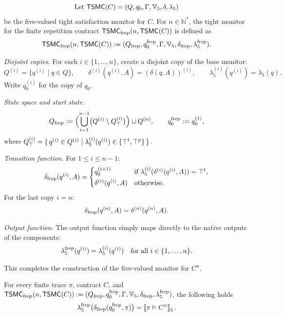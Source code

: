 \begin{definition}
\label{def:moore-repeat-finite}
\[\text{Let } \mathsf{TSMC}(C)=(Q,q_0,\Gamma,\mathbb{V}_5 ,\delta,\lambda_5)\]
be the five-valued tight satisfaction monitor for $C$.  
For $n\in\mathbb{N}^*$, the tight monitor for the finite repetition contract
$\mathsf{TSMC}_{\text{frep}}(n,\mathsf{TSMC}(C))$ is defined as
\[
\mathsf{TSMC}_{\text{frep}}(n,\mathsf{TSMC}(C))
  := (Q_{\text{frep}},q_0^{\text{frep}},\Gamma,\mathbb{V}_5 ,\delta_{\text{frep}},\lambda_5^{\text{frep}}).
\]

\medskip
\noindent\emph{Disjoint copies.}
For each $i\in\{1,\dots,n\}$, create a disjoint copy of the base monitor:
\[
Q^{(i)}=\{q^{(i)}\mid q\in Q\},\qquad
\delta^{(i)}(q^{(i)},A)=(\delta(q,A))^{(i)},\qquad
\lambda_5^{(i)}(q^{(i)})=\lambda_5(q).
\]
Write $q_0^{(i)}$ for the copy of $q_0$.

\medskip
\noindent\emph{State space and start state.}
\[
Q_{\text{frep}}
  := \Bigl(\bigcup_{i=1}^{n-1} \bigl(Q^{(i)} \setminus Q^{(i)}_{\top}\bigr)\Bigr) \cup Q^{(n)},
\qquad
q_0^{\text{frep}} := q_0^{(1)},
\]
where $Q^{(i)}_{\top} = \{\, q^{(i)} \in Q^{(i)} \mid \lambda_5^{(i)}(q^{(i)}) \in \{\top^t,\top^p\}\,\}$.

\medskip
\noindent\emph{Transition function.}  
For $1\le i\le n-1$:
\[
\delta_{\text{frep}}(q^{(i)},A)=
\begin{cases}
q_0^{(i+1)}
   & \text{if }\lambda_5^{(i)}(\delta^{(i)}(q^{(i)},A))=\top^t,\\[2pt]
\delta^{(i)}(q^{(i)},A)
   & \text{otherwise}.
\end{cases}
\]
For the last copy $i=n$:
\[
\delta_{\text{frep}}(q^{(n)},A) = \delta^{(n)}(q^{(n)},A).
\]

\medskip
\noindent\emph{Output function.}
The output function simply maps directly to the native outputs of the components:
\[
\lambda_5^{\text{frep}}(q^{(i)}) = \lambda_5^{(i)}(q^{(i)}) \quad \text{for all } i \in \{1,\dots,n\}.
\]

\medskip
\noindent
This completes the construction of the five-valued monitor for $C^n$.
\end{definition}

\begin{lemma}
\label{lem:repeat-finite-correct}
For every finite trace $\pi$, contract $C$, and
$\mathsf{TSMC}_{\text{frep}}(n,\mathsf{TSMC}(C))
  := (Q_{\text{frep}},q_0^{\text{frep}},\Gamma,\mathbb{V}_5 ,\delta_{\text{frep}},\lambda_5^{\text{frep}})$, the following holds
\[
\lambda_5^{\text{frep}}\bigl(\delta_{\text{frep}}(q_0^{\text{frep}},\pi)\bigr)
   = \left\llbracket \pi \vDash C^n \right\rrbracket_{5}.
\]
\end{lemma}




